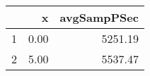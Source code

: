 \begin{table}[h]
\centering
\begin{tabular}{rrr}
  \hline
 & x & avgSampPSec \\ 
  \hline
1 & 0.00 & 5251.19 \\ 
   \hline
2 & 5.00 & 5537.47 \\ 
   \hline
\end{tabular}
\end{table}
